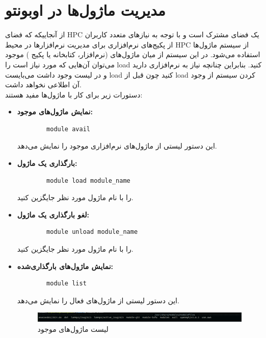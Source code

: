 \documentclass[a4paper,12pt]{article}
\begin{document}
\section{مدیریت ماژول‌ها در اوبونتو}
از آنجاییکه که فضای HPC یک فضای مشترک است و با توجه به نیازهای متعدد کاربران از پکیج‌های نرم‌افزاری برای مدیریت نرم‌افزارها در محیط HPC از سیستم ماژول‌ها استفاده می‌شود. در این سیستم از میان ماژول‌های (نرم‌افزار، کتابخانه یا پکیج ) موجود می‌توان آن‌هایی که مورد نیاز است را load کنید. بنابراین چنانچه نیاز به نرم‌افزاری دارید و در لیست وجود داشت می‌بایست load کنید چون قبل از load کردن سیستم از وجود آن اطلاعی نخواهد داشت.\\
 دستورات زیر برای کار با ماژول‌ها مفید هستند:
\begin{itemize}
	\item \textbf{نمایش ماژول‌های موجود:}
	\begin{latin}
		\begin{verbatim}
		module avail
		\end{verbatim}
	\end{latin}
	این دستور لیستی از ماژول‌های نرم‌افزاری موجود را نمایش می‌دهد.
	
	\item \textbf{بارگذاری یک ماژول:}
	\begin{latin}
		\begin{verbatim}
		module load module_name
		\end{verbatim}
	\end{latin}
	 را با نام ماژول مورد نظر جایگزین کنید.
	
	\item \textbf{لغو بارگذاری یک ماژول:}
	\begin{latin}
		\begin{verbatim}
		module unload module_name
		\end{verbatim}
	\end{latin}
	 را با نام ماژول مورد نظر جایگزین کنید.
	
	\item \textbf{نمایش ماژول‌های بارگذاری‌شده:}
	\begin{latin}
		\begin{verbatim}
		module list
		\end{verbatim}
	\end{latin}
	این دستور لیستی از ماژول‌های فعال را نمایش می‌دهد.
\begin{figure}[h!]
	\centering
	\includegraphics[width=0.7\linewidth]{module_avail.png}
	\caption{لیست ماژول‌های موجود}
	\label{fig:moduleavail}
\end{figure}

\end{itemize}
\end{document}
